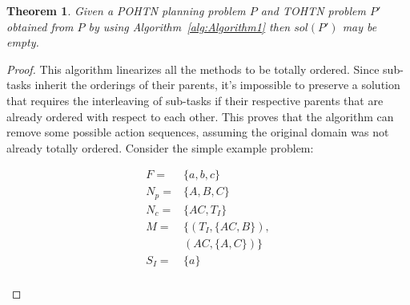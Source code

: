 \documentclass[letterpaper]{article} %
\newtheorem{theorem}{Theorem}
\begin{document}
\begin{theorem}\label{thm:notCompleteness}
	Given a POHTN planning problem $P$ and TOHTN problem
	$P'$ obtained from $P$ by using Algorithm~\ref{alg:Algorithm1}
	then $sol(P')$ may be empty.
\end{theorem}
\begin{proof}
	This algorithm linearizes all the methods to be totally ordered. Since sub-tasks inherit the orderings of their parents, it's impossible to preserve a solution that requires the interleaving of sub-tasks if their respective parents that are already ordered with respect to each other. This proves that the algorithm can remove some possible action sequences, assuming the original domain was not already totally ordered. Consider the simple example problem:
	
	
	\begin{figure}
		\caption{Diagram showing an example problem and its decomposition.}		
		\begin{subfigure}{3.5cm}
			\begin{align*}
			F   = & \{a, b, c \}           \\
			N_p = & \{A, B, C\}      \\
			N_c = & \{AC, T_I\}            \\ 
			M   = & \{  (T_I, \{AC, B\}), \\
			&    (AC, \{A, C\})  \} \\
			S_I = & \{ a \} 	             \\ 
			\end{align*} 
		\end{subfigure}		
\end{figure}
\end{proof}
\end{document}

